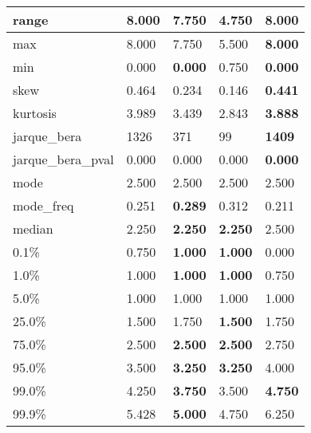 \begin{table}[H]
\begin{tabular}{|l|m{10em}|m{10em}|m{10em}|m{10em}|}
\hline range & 8.000 & 7.750 & \cellcolor[rgb]{0.9, 0.54, 0.52} 4.750 & \bfseries 8.000 \\
\hline max & 8.000 & 7.750 & \cellcolor[rgb]{0.9, 0.54, 0.52} 5.500 & \bfseries 8.000 \\
\hline min & 0.000 & \bfseries 0.000 & \cellcolor[rgb]{0.9, 0.54, 0.52} 0.750 & \bfseries 0.000 \\
\hline skew & 0.464 & 0.234 & \cellcolor[rgb]{0.9, 0.54, 0.52} 0.146 & \bfseries 0.441 \\
\hline kurtosis & 3.989 & 3.439 & \cellcolor[rgb]{0.9, 0.54, 0.52} 2.843 & \bfseries 3.888 \\
\hline jarque\_bera & 1326 & 371 & \cellcolor[rgb]{0.9, 0.54, 0.52} 99 & \bfseries 1409 \\
\hline jarque\_bera\_pval & 0.000 & 0.000 & \cellcolor[rgb]{0.9, 0.54, 0.52} 0.000 & \bfseries 0.000 \\
\hline mode & 2.500 & 2.500 & 2.500 & 2.500 \\
\hline mode\_freq & 0.251 & \bfseries 0.289 & \cellcolor[rgb]{0.9, 0.54, 0.52} 0.312 & 0.211 \\
\hline median & 2.250 & \bfseries 2.250 & \bfseries 2.250 & \cellcolor[rgb]{0.9, 0.54, 0.52} 2.500 \\
\hline 0.1\% & 0.750 & \bfseries 1.000 & \bfseries 1.000 & \cellcolor[rgb]{0.9, 0.54, 0.52} 0.000 \\
\hline 1.0\% & 1.000 & \bfseries 1.000 & \bfseries 1.000 & \cellcolor[rgb]{0.9, 0.54, 0.52} 0.750 \\
\hline 5.0\% & 1.000 & 1.000 & 1.000 & 1.000 \\
\hline 25.0\% & 1.500 & \cellcolor[rgb]{0.9, 0.54, 0.52} 1.750 & \bfseries 1.500 & \cellcolor[rgb]{0.9, 0.54, 0.52} 1.750 \\
\hline 75.0\% & 2.500 & \bfseries 2.500 & \bfseries 2.500 & \cellcolor[rgb]{0.9, 0.54, 0.52} 2.750 \\
\hline 95.0\% & 3.500 & \bfseries 3.250 & \bfseries 3.250 & \cellcolor[rgb]{0.9, 0.54, 0.52} 4.000 \\
\hline 99.0\% & 4.250 & \bfseries 3.750 & \cellcolor[rgb]{0.9, 0.54, 0.52} 3.500 & \bfseries 4.750 \\
\hline 99.9\% & 5.428 & \bfseries 5.000 & 4.750 & \cellcolor[rgb]{0.9, 0.54, 0.52} 6.250 \\
\hline
\end{tabular}
\end{table}
